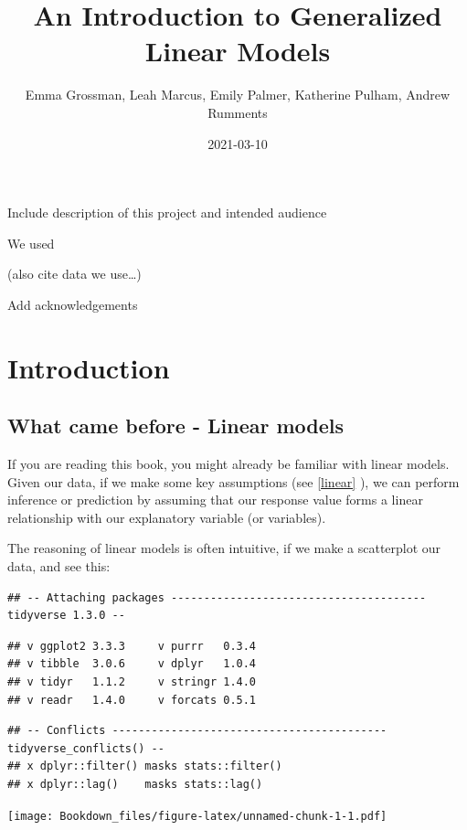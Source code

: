 \documentclass[
]{book}
\title{An Introduction to Generalized Linear Models}
\author{Emma Grossman, Leah Marcus, Emily Palmer, Katherine Pulham, Andrew Rumments}
\date{2021-03-10}
\begin{document}
\maketitle

{
\setcounter{tocdepth}{1}
\tableofcontents
}
Include description of this project and intended audience

We used \citep{dunn2018generalized}

(also cite data we use\ldots)

Add acknowledgements

\hypertarget{intro}{%
\chapter{Introduction}\label{intro}}

\hypertarget{what-came-before---linear-models}{%
\section{What came before - Linear models}\label{what-came-before---linear-models}}

If you are reading this book, you might already be familiar with linear models. Given our data, if we make some key assumptions (see \ref{linear} ), we can perform inference or prediction by assuming that our response value forms a linear relationship with our explanatory variable (or variables).

The reasoning of linear models is often intuitive, if we make a scatterplot our data, and see this:

\begin{verbatim}
## -- Attaching packages --------------------------------------- tidyverse 1.3.0 --
\end{verbatim}

\begin{verbatim}
## v ggplot2 3.3.3     v purrr   0.3.4
## v tibble  3.0.6     v dplyr   1.0.4
## v tidyr   1.1.2     v stringr 1.4.0
## v readr   1.4.0     v forcats 0.5.1
\end{verbatim}

\begin{verbatim}
## -- Conflicts ------------------------------------------ tidyverse_conflicts() --
## x dplyr::filter() masks stats::filter()
## x dplyr::lag()    masks stats::lag()
\end{verbatim}

\texttt{[image: Bookdown\_files/figure-latex/unnamed-chunk-1-1.pdf]}
\end{document}
